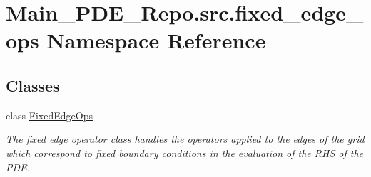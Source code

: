 \hypertarget{namespaceMain__PDE__Repo_1_1src_1_1fixed__edge__ops}{}\section{Main\+\_\+\+P\+D\+E\+\_\+\+Repo.\+src.\+fixed\+\_\+edge\+\_\+ops Namespace Reference}
\label{namespaceMain__PDE__Repo_1_1src_1_1fixed__edge__ops}
\subsection*{Classes}
\begin{DoxyCompactItemize}
\item 
class \hyperlink{classMain__PDE__Repo_1_1src_1_1fixed__edge__ops_1_1FixedEdgeOps}{Fixed\+Edge\+Ops}
\begin{DoxyCompactList}\small\item\em The fixed edge operator class handles the operators applied to the edges of the grid which correspond to fixed boundary conditions in the evaluation of the R\+HS of the P\+DE. \end{DoxyCompactList}\end{DoxyCompactItemize}
